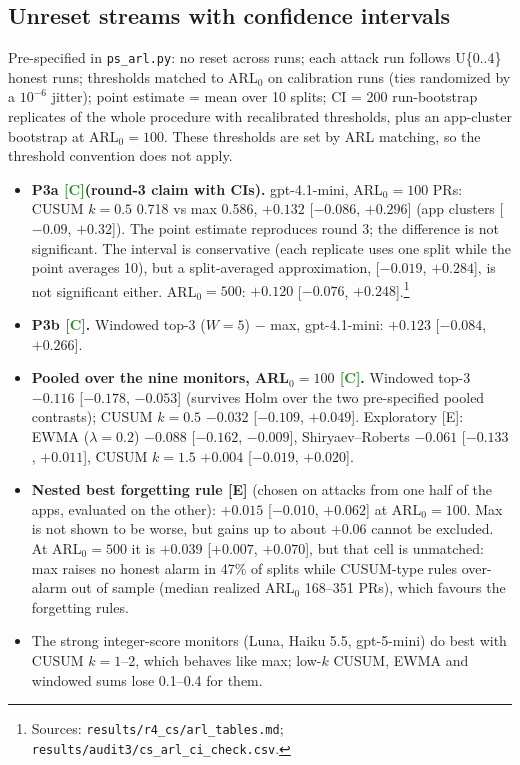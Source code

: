 \documentclass[11pt]{article}
\newcommand{\m}{\ensuremath{-}}
\newcommand{\srcs}[2]{\footnote{Sources: \nolinkurl{#1}; \nolinkurl{#2}.}}
\newcommand{\tC}{\textsf{\scriptsize\textcolor{ForestGreen}{[C]}}\xspace}
\newcommand{\tE}{\textsf{\scriptsize\textcolor{ink2}{[E]}}\xspace}
\begin{document}
\subsection{Unreset streams with confidence intervals}\label{sec:r4arl}
Pre-specified in \texttt{ps\_arl.py}: no reset across runs; each attack run follows U\{0..4\} honest runs; thresholds matched to ARL$_0$ on calibration runs (ties randomized by a $10^{-6}$ jitter); point estimate = mean over 10 splits; CI = 200 run-bootstrap replicates of the whole procedure with recalibrated thresholds, plus an app-cluster bootstrap at ARL$_0=100$. These thresholds are set by ARL matching, so the threshold convention does not apply.

\begin{itemize}
\item \textbf{P3a \tC (round-3 claim with CIs).} gpt-4.1-mini, ARL$_0=100$ PRs: CUSUM $k{=}0.5$ 0.718 vs max 0.586, $+0.132$ [$\m0.086$, $+0.296$] (app clusters [$\m0.09$, $+0.32$]). The point estimate reproduces round 3; the difference is not significant. The interval is conservative (each replicate uses one split while the point averages 10), but a split-averaged approximation, [$\m0.019$, $+0.284$], is not significant either. ARL$_0=500$: $+0.120$ [$\m0.076$, $+0.248$].\srcs{results/r4_cs/arl_tables.md}{results/audit3/cs_arl_ci_check.csv}
\item \textbf{P3b \tC.} Windowed top-3 ($W=5$) $-$ max, gpt-4.1-mini: $+0.123$ [$\m0.084$, $+0.266$].
\item \textbf{Pooled over the nine monitors, ARL$_0=100$ \tC.} Windowed top-3 $\m0.116$ [$\m0.178$, $\m0.053$] (survives Holm over the two pre-specified pooled contrasts); CUSUM $k{=}0.5$ $\m0.032$ [$\m0.109$, $+0.049$]. Exploratory \tE: EWMA ($\lambda=0.2$) $\m0.088$ [$\m0.162$, $\m0.009$], Shiryaev--Roberts $\m0.061$ [$\m0.133$, $+0.011$], CUSUM $k{=}1.5$ $+0.004$ [$\m0.019$, $+0.020$].
\item \textbf{Nested best forgetting rule \tE} (chosen on attacks from one half of the apps, evaluated on the other): $+0.015$ [$\m0.010$, $+0.062$] at ARL$_0=100$. Max is not shown to be worse, but gains up to about $+0.06$ cannot be excluded. At ARL$_0=500$ it is $+0.039$ [$+0.007$, $+0.070$], but that cell is unmatched: max raises no honest alarm in 47\% of splits while CUSUM-type rules over-alarm out of sample (median realized ARL$_0$ 168--351 PRs), which favours the forgetting rules.
\item The strong integer-score monitors (Luna, Haiku 5.5, gpt-5-mini) do best with CUSUM $k=1$--2, which behaves like max; low-$k$ CUSUM, EWMA and windowed sums lose 0.1--0.4 for them.
\end{itemize}
\end{document}
